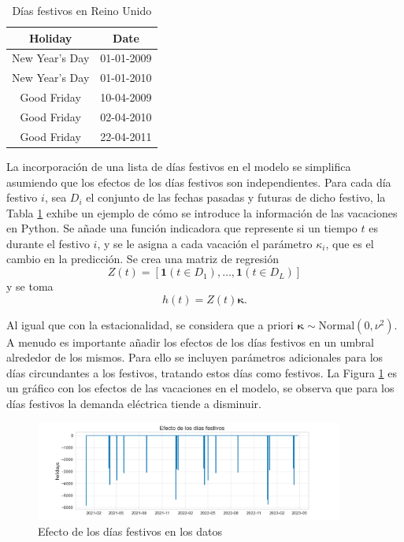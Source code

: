 \documentclass[12pt,twoside]{article}
\begin{document}
\begin{table}[h] 
\centering
\begin{tabular}{cc} \hline
Holiday & Date \\\hline
New Year's Day & 01-01-2009\\
New Year's Day & 01-01-2010\\
Good Friday & 10-04-2009 \\
Good Friday & 02-04-2010 \\
Good Friday & 22-04-2011 \\ \hline

\end{tabular}
\caption{Días festivos en Reino Unido} \label{tab:festivos}
\end{table}
La incorporación de una lista de días festivos en el modelo se simplifica asumiendo que los efectos de los días festivos son independientes. Para cada día festivo $i$, sea $D_i$ el conjunto de las fechas pasadas y futuras de dicho festivo, la Tabla \ref{tab:festivos} exhibe un ejemplo de cómo se introduce la información de las vacaciones en Python. Se añade una función indicadora que represente si un tiempo $t$ es durante el festivo $i$, y se le asigna a cada vacación el parámetro $\kappa_i$, que es el cambio en la predicción. Se crea una matriz de regresión
\begin{equation*}
    Z(t) = [\mathbf{1}(t\in D_1), \dotsc, \mathbf{1}(t\in D_L)]
\end{equation*}
y se toma 
\begin{equation}\label{eq:prophet:h}
    h(t) = Z(t) \boldsymbol{\kappa}.
    \end{equation}

Al igual que con la estacionalidad, se considera que a priori $\boldsymbol{\kappa} \sim \text{Normal}(0, \nu^2)$. A menudo es importante añadir los efectos de los días festivos en un umbral alrededor de los mismos. Para ello se incluyen parámetros adicionales para los días circundantes a los festivos, tratando estos días como festivos. La Figura \ref{fig:prophet_hday} es un gráfico con los efectos de las vacaciones en el modelo, se observa que para los días festivos la demanda eléctrica tiende a disminuir.
\begin{figure}[h]
\centering
    \includegraphics[width = 0.9\textwidth]{imagenes/prophet_hday.png}
    \caption{Efecto de los días festivos en los datos}\label{fig:prophet_hday}
\end{figure}
\end{document}
